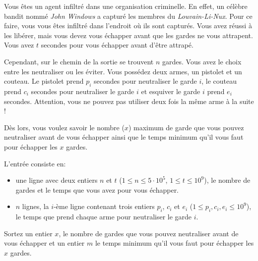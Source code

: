 \problemname{\problemyamlname}


Vous êtes un agent infiltré dans une organisation criminelle. En effet, un célèbre bandit nommé \textit{John Windows} a capturé les membres du \textit{Louvain-Li-Nux}. Pour ce faire, vous vous êtes infiltré dans l'endroit où ils sont capturés. Vous avez réussi à les libérer, mais vous devez vous échapper avant que les gardes ne vous attrapent.  Vous avez $t$ secondes pour vous échapper avant d'être attrapé.

Cependant, sur le chemin de la sortie se trouvent $n$ gardes. Vous avez le choix entre les neutraliser ou les éviter. Vous possédez deux armes, un pistolet et un couteau. Le pistolet prend $p_i$ secondes pour neutraliser le garde $i$, le couteau prend $c_i$ secondes pour neutraliser le garde $i$ et esquiver le garde $i$ prend $e_i$ secondes. Attention, vous ne pouvez pas utiliser deux fois la même arme à la suite !

Dès lors, vous voulez savoir le nombre ($x$) maximum de garde que vous pouvez neutraliser avant de vous échapper ainsi que le temps minimum qu'il vous faut pour échapper les $x$ gardes.
\begin{Input}
    L'entrée consiste en:
    \begin{itemize}
        \item une ligne avec deux entiers $n$ et $t$ ($1\leq n \leq 5 \cdot 10^5$, $1\leq t \leq 10^9$), le nombre de gardes et le temps que vous avez pour vous échapper.
        \item $n$ lignes, la $i$-ème ligne contenant trois entiers  $p_i$, $c_i$ et $e_i$ ($1\leq p_i, c_i, e_i \leq 10^9$), le temps que prend chaque arme pour neutraliser le garde $i$.
    \end{itemize}
\end{Input}

\begin{Output}
    Sortez un entier $x$, le nombre de gardes que vous pouvez neutraliser avant de vous échapper et un entier $m$ le temps minimum qu'il vous faut pour échapper les $x$ gardes.
\end{Output}
